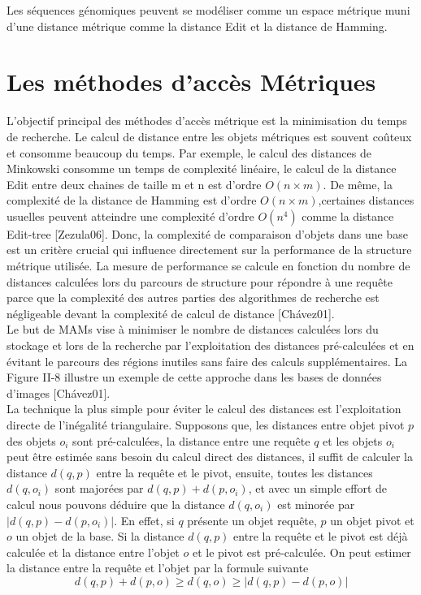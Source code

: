 Les séquences génomiques peuvent se modéliser comme un espace métrique muni d’une distance métrique comme la distance Edit et la distance de Hamming.

\section{Les méthodes d’accès Métriques}
L'objectif principal des méthodes d’accès métrique est la minimisation du temps de recherche. Le calcul de distance entre les objets métriques est souvent coûteux et consomme beaucoup du temps. Par exemple, le calcul des distances de Minkowski consomme un temps de complexité linéaire, le calcul de la distance Edit entre deux chaines de taille m et n est d’ordre $ O(n\times m) $. De même, la complexité de la distance de Hamming est d’ordre $ O(n\times m) $,certaines distances usuelles peuvent atteindre une complexité d’ordre $ O(n^4)  $ comme la distance Edit-tree [Zezula06]. Donc, la complexité de comparaison d’objets dans une base est un critère crucial qui influence directement sur la performance de la structure métrique utilisée. La mesure de performance se calcule en fonction du nombre de distances calculées lors du parcours de structure pour répondre à une requête parce que la complexité des autres parties des algorithmes de recherche est négligeable devant la complexité de calcul de distance [Chávez01].\\

Le but de MAMs vise à minimiser le nombre de distances calculées lors du stockage et lors de la recherche par l’exploitation des distances pré-calculées et en évitant le parcours des régions inutiles sans faire des calculs supplémentaires. La Figure II-8 illustre un exemple de cette approche dans les bases de données d’images [Chávez01].\\


La technique la plus simple pour éviter le calcul des distances est l’exploitation directe de l’inégalité triangulaire. Supposons que, les distances entre objet pivot $ p $ des objets $ o_i $ sont pré-calculées, la distance entre une requête $ q $ et les objets $ o_i $ peut être estimée sans besoin du calcul direct des distances, il suffit de calculer la distance $ d(q,p) $ entre la requête et le pivot, ensuite, toutes les distances $ d(q,o_i) $ sont majorées par $ d(q,p)+d(p,o_i) $, et avec un simple effort de calcul nous pouvons déduire que la distance $ d(q,o_i) $ est minorée par $ |d(q,p)-d(p,o_i)| $. En effet, si $ q $ présente un objet requête, $ p $ un objet pivot et $ o $ un objet de la base. Si la distance $ d(q,p) $ entre la requête et le pivot est déjà calculée et la distance entre l’objet $ o $ et le pivot est pré-calculée. On peut estimer la distance entre la requête et l’objet par la formule suivante 
\begin{equation}
    d(q,p)+d(p,o) \geq d(q,o) \geq |d(q,p)-d(p,o)|
\end{equation}

